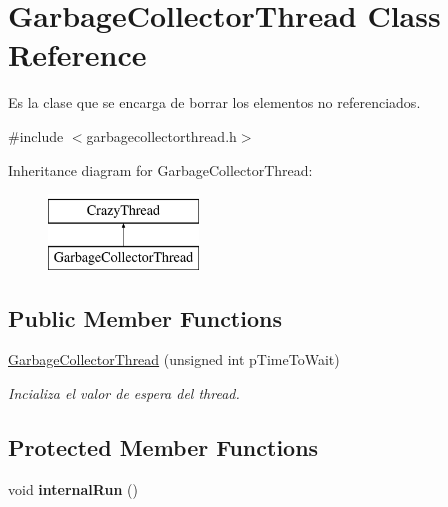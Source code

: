 \hypertarget{class_garbage_collector_thread}{\section{Garbage\-Collector\-Thread Class Reference}
\label{class_garbage_collector_thread}
}


Es la clase que se encarga de borrar los elementos no referenciados.  




{\ttfamily \#include $<$garbagecollectorthread.\-h$>$}

Inheritance diagram for Garbage\-Collector\-Thread\-:\begin{figure}[H]
\begin{center}
\leavevmode
\includegraphics[height=2.000000cm]{class_garbage_collector_thread}
\end{center}
\end{figure}
\subsection*{Public Member Functions}
\begin{DoxyCompactItemize}
\item 
\hyperlink{class_garbage_collector_thread_a0c4840e9a065994f8fcd61098ddc5fe0}{Garbage\-Collector\-Thread} (unsigned int p\-Time\-To\-Wait)
\begin{DoxyCompactList}\small\item\em Incializa el valor de espera del thread. \end{DoxyCompactList}\end{DoxyCompactItemize}
\subsection*{Protected Member Functions}
\begin{DoxyCompactItemize}
\item 
\hypertarget{class_garbage_collector_thread_a83e5fd4ed87eff4383e60960cf34854b}{void {\bfseries internal\-Run} ()}\label{class_garbage_collector_thread_a83e5fd4ed87eff4383e60960cf34854b}

\end{DoxyCompactItemize}


